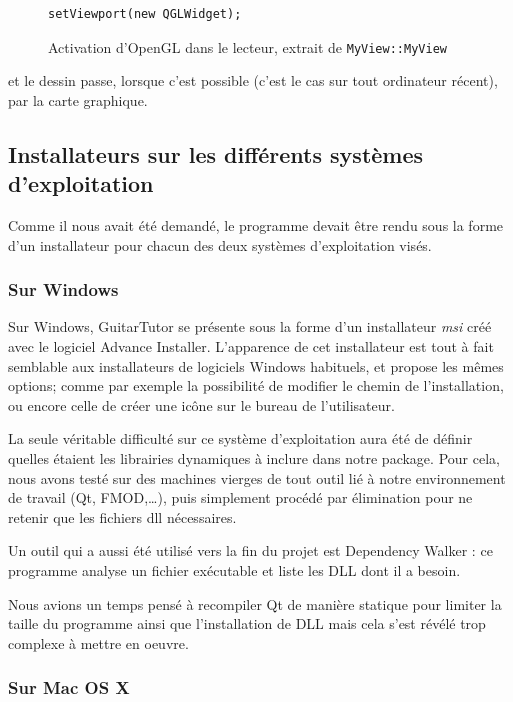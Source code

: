 \begin{figure}[H]
\begin{lstlisting}
setViewport(new QGLWidget);
\end{lstlisting}
\caption{Activation d'OpenGL dans le lecteur, extrait de \texttt{MyView::MyView}}
\label{player_opengl}
\end{figure}

et le dessin passe, lorsque c'est possible (c'est le cas sur tout ordinateur récent), par la carte graphique.

\subsection{Installateurs sur les différents systèmes d'exploitation}

Comme il nous avait été demandé, le programme devait être rendu sous la forme d'un installateur pour chacun des deux systèmes d'exploitation visés.

\subsubsection{Sur Windows}

Sur Windows, GuitarTutor se présente sous la forme d'un installateur \textit{msi} créé avec le logiciel Advance Installer. L'apparence de cet installateur est tout à fait semblable aux installateurs de logiciels Windows habituels, et propose les mêmes options; comme par exemple la possibilité de modifier le chemin de l'installation, ou encore celle de créer une icône sur le bureau de l'utilisateur.

La seule véritable difficulté sur ce système d'exploitation aura été de définir quelles étaient les librairies dynamiques à inclure dans notre package. Pour cela, nous avons testé sur des machines vierges de tout outil lié à notre environnement de travail (Qt, FMOD,\dots), puis simplement procédé par élimination pour ne retenir que les fichiers dll nécessaires.

Un outil qui a aussi été utilisé vers la fin du projet est Dependency Walker : ce programme analyse un fichier exécutable et liste les
DLL dont il a besoin.

Nous avions un temps pensé à recompiler Qt de manière statique pour limiter la taille du programme ainsi que l'installation de DLL mais cela s'est révélé trop complexe à mettre en oeuvre.

\subsubsection{Sur Mac OS X}

